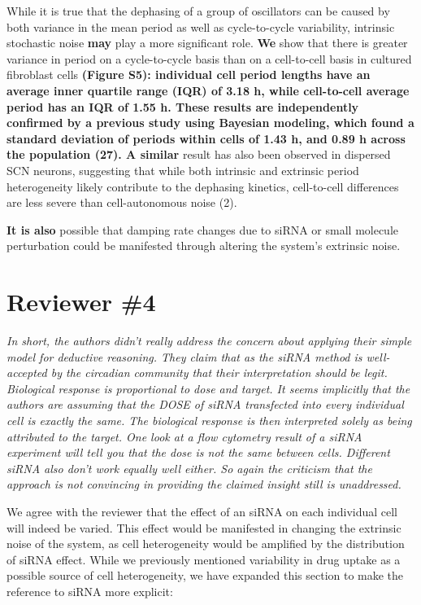 \documentclass[11pt, letterpaper]{article}
\newenvironment{reviewer}{\itshape\color{gray}}{}
\newenvironment{manuscript}[1]{\begin{center}\begin{tcolorbox}[colback=green!5!white,colframe=green!75!black,width=\textwidth,title={#1},breakable,fonttitle=\bfseries]}{\end{tcolorbox}\end{center}}
\begin{document}
\begin{manuscript}{Page 6}
  While it is true that the dephasing of a group of oscillators can be caused by both variance in the mean period as well as cycle-to-cycle variability, intrinsic stochastic noise {\bf may} play a more significant role. 
{\bf We} show that there is greater variance in period on a cycle-to-cycle basis than on a cell-to-cell basis in cultured fibroblast cells {\bf (Figure S5): individual cell period lengths have an average inner quartile range (IQR) of 3.18 h, while cell-to-cell average period has an IQR of 1.55 h. 
These results are independently confirmed by a previous study using Bayesian modeling, which found a standard deviation of periods within cells of 1.43 h, and 0.89 h across the population (27). 
A similar} result has also been observed in dispersed SCN neurons, suggesting that while both intrinsic and extrinsic period heterogeneity likely contribute to the dephasing kinetics, cell-to-cell differences are less severe than cell-autonomous noise (2).

{\bf It is also} possible that damping rate changes due to siRNA or small molecule perturbation could be manifested through altering the system's extrinsic noise.

\end{manuscript}

\section*{Reviewer \#4}

\begin{reviewer}
In short, the authors didn't really address the concern about applying their simple model for deductive reasoning. 
They claim that as the siRNA method is well-accepted by the circadian community that their interpretation should be legit. 
Biological response is proportional to dose and target. 
It seems implicitly that the authors are assuming that the DOSE of siRNA transfected into every individual cell is exactly the same. 
The biological response is then interpreted solely as being attributed to the target. 
One look at a flow cytometry result of a siRNA experiment will tell you that the dose is not the same between cells. 
Different siRNA also don't work equally well either. 
So again the criticism that the approach is not convincing in providing the claimed insight still is unaddressed.
\end{reviewer}

We agree with the reviewer that the effect of an siRNA on each individual cell will indeed be varied.
This effect would be manifested in changing the extrinsic noise of the system, as cell heterogeneity would be amplified by the distribution of siRNA effect.
While we previously mentioned variability in drug uptake as a possible source of cell heterogeneity, we have expanded this section to make the reference to siRNA more explicit:
\end{document}
